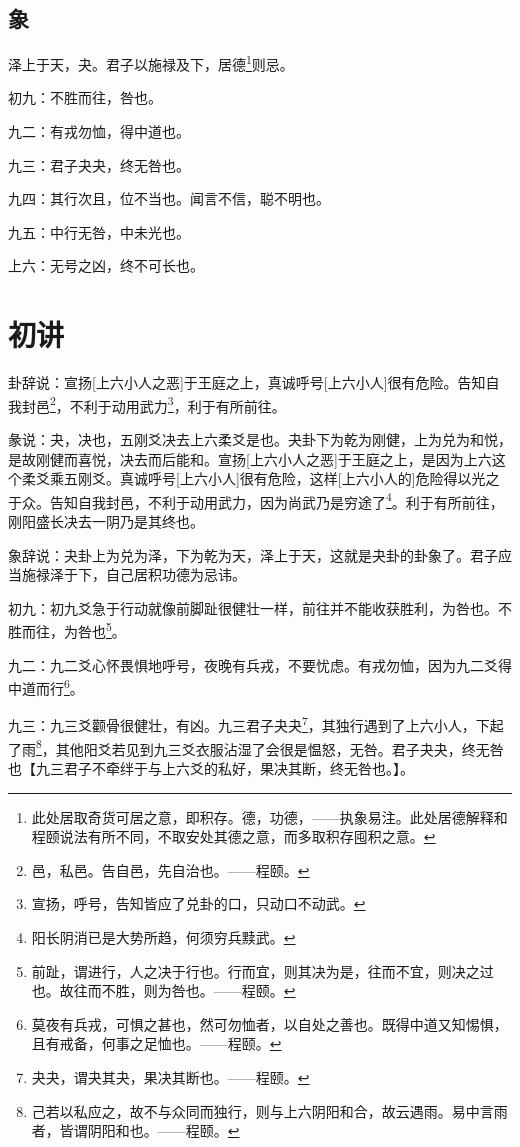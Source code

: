 \documentclass[12pt,oneside]{book}
\begin{document}
\subsection{象}
泽上于天，夬。君子以施禄及下，居德\footnote{此处居取奇货可居之意，即积存。德，功德，——执象易注。此处居德解释和程颐说法有所不同，不取安处其德之意，而多取积存囤积之意。}则忌。

初九：不胜而往，咎也。

九二：有戎勿恤，得中道也。

九三：君子夬夬，终无咎也。

九四：其行次且，位不当也。闻言不信，聪不明也。

九五：中行无咎，中未光也。

上六：无号之凶，终不可长也。

\section{初讲}
卦辞说：宣扬[上六小人之恶]于王庭之上，真诚呼号[上六小人]很有危险。告知自我封邑\footnote{邑，私邑。告自邑，先自治也。——程颐。}，不利于动用武力\footnote{宣扬，呼号，告知皆应了兑卦的口，只动口不动武。}，利于有所前往。

彖说：夬，决也，五刚爻决去上六柔爻是也。夬卦下为乾为刚健，上为兑为和悦，是故刚健而喜悦，决去而后能和。宣扬[上六小人之恶]于王庭之上，是因为上六这个柔爻乘五刚爻。真诚呼号[上六小人]很有危险，这样[上六小人的]危险得以光之于众。告知自我封邑，不利于动用武力，因为尚武乃是穷途了\footnote{阳长阴消已是大势所趋，何须穷兵黩武。}。利于有所前往，刚阳盛长决去一阴乃是其终也。

象辞说：夬卦上为兑为泽，下为乾为天，泽上于天，这就是夬卦的卦象了。君子应当施禄泽于下，自己居积功德为忌讳。

初九：初九爻急于行动就像前脚趾很健壮一样，前往并不能收获胜利，为咎也。不胜而往，为咎也\footnote{前趾，谓进行，人之决于行也。行而宜，则其决为是，往而不宜，则决之过也。故往而不胜，则为咎也。——程颐。}。

九二：九二爻心怀畏惧地呼号，夜晚有兵戎，不要忧虑。有戎勿恤，因为九二爻得中道而行\footnote{莫夜有兵戎，可惧之甚也，然可勿恤者，以自处之善也。既得中道又知惕惧，且有戒备，何事之足恤也。——程颐。}。

九三：九三爻颧骨很健壮，有凶。九三君子夬夬\footnote{夬夬，谓夬其夬，果决其断也。——程颐。}，其独行遇到了上六小人，下起了雨\footnote{己若以私应之，故不与众同而独行，则与上六阴阳和合，故云遇雨。易中言雨者，皆谓阴阳和也。——程颐。}，其他阳爻若见到九三爻衣服沾湿了会很是愠怒，无咎。君子夬夬，终无咎也【九三君子不牵绊于与上六爻的私好，果决其断，终无咎也。】。
\end{document}
